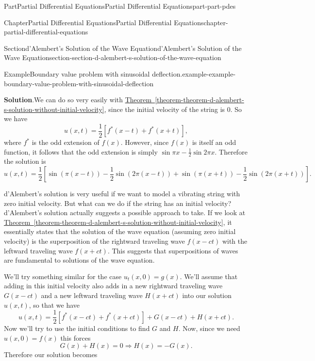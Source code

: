 \documentclass[twoside,10pt,]{book}
\newcommand{\blocktitlefont}{\relax}
\newcommand{\xreffont}{\relax}
\numberwithin{equation}{part}
\begin{document}
\begin{partptx}{Part}{Partial Differential Equations}{}{Partial Differential Equations}{}{}{part-part-pdes}
\begin{chapterptx}{Chapter}{Partial Differential Equations}{}{Partial Differential Equations}{}{}{chapter-partial-differential-equations}
\begin{sectionptx}{Section}{d'Alembert's Solution of the Wave Equation}{}{d'Alembert's Solution of the Wave Equation}{}{}{section-section-d-alembert-s-solution-of-the-wave-equation}
\begin{example}{Example}{Boundary value problem with sinusoidal deflection.}{example-example-boundary-value-problem-with-sinusoidal-deflection}
\par\smallskip%
\noindent\textbf{\blocktitlefont Solution}.\hypertarget{solution-example-boundary-value-problem-with-sinusoidal-deflection-c}{}\quad{}We can do so very easily with \hyperref[theorem-theorem-d-alembert-s-solution-without-initial-velocity]{Theorem~{\xreffont\ref{theorem-theorem-d-alembert-s-solution-without-initial-velocity}}}, since the initial velocity of the string is \(0\). So we have%
\begin{equation*}
u(x,t) = \frac{1}{2}[f^{*}(x-t)+f^{*}(x+t)],
\end{equation*}
where \(f^{*}\) is the odd extension of \(f(x)\). However, since \(f(x)\) is itself an odd function, it follows that the odd extension is simply \(\sin\pi x-\frac{1}{2}\sin2\pi x\). Therefore the solution is%
%
\begin{equation*}
u(x,t) = \frac{1}{2}\left[\sin(\pi(x-t))-\frac{1}{2}\sin(2\pi(x-t)) + \sin(\pi(x+t)) - \frac{1}{2}\sin(2\pi(x+t))\right].
\end{equation*}
\end{example}
d'Alembert's solution is very useful if we want to model a vibrating string with zero initial velocity. But what can we do if the string has an initial velocity? d'Alembert's solution actually suggests a possible approach to take. If we look at \hyperref[theorem-theorem-d-alembert-s-solution-without-initial-velocity]{Theorem~{\xreffont\ref{theorem-theorem-d-alembert-s-solution-without-initial-velocity}}}, it essentially states that the solution of the wave equation (assuming zero initial velocity) is the superposition of the rightward traveling wave \(f(x-ct)\) with the leftward traveling wave \(f(x+ct)\). This suggests that superpositions of waves are fundamental to solutions of the wave equation.%
\par
We'll try something similar for the case \(u_{t}(x,0) = g(x)\). We'll assume that adding in this initial velocity also adds in a new rightward traveling wave \(G(x-ct)\) and a new leftward traveling wave \(H(x+ct)\) into our solution \(u(x,t)\), so that we have%
%
\begin{equation*}
u(x,t) = \frac{1}{2}[f^{*}(x-ct)+f^{*}(x+ct)] + G(x-ct) + H(x+ct).
\end{equation*}
Now we'll try to use the initial conditions to find \(G\) and \(H\). Now, since we need \(u(x,0) = f(x)\) this forces%
%
\begin{equation*}
G(x) + H(x) = 0\Rightarrow H(x) = -G(x).
\end{equation*}
Therefore our solution becomes%

\end{sectionptx}
\end{chapterptx}
\end{partptx}
\end{document}
